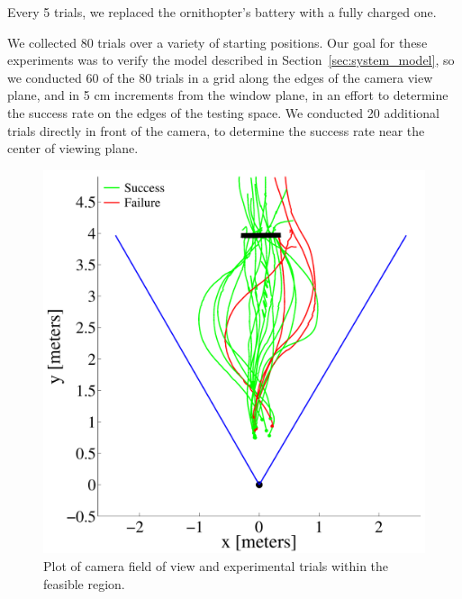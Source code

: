 \documentclass{aamas2013}
\begin{document}
Every 5 trials, we replaced the ornithopter's battery with a fully 
charged one.

We collected 80 trials over a variety of starting positions. Our 
goal for these experiments was to verify the model described in 
Section~\ref{sec:system_model}, so we conducted 60 of the 80 trials in a 
grid along the edges of the camera view plane, and in 5 cm increments 
from the window plane, in an effort to determine the success rate on the edges of 
the testing space. We conducted 20 additional trials directly in front of 
the camera, to determine the success rate near the center of viewing plane.

\begin{figure}[tb]
\begin{minipage}[b]{0.45\linewidth}
\centering
\includegraphics[width=\linewidth]{figures/flight_paths_feasible.pdf}
\caption{Plot of camera field of view and experimental trials within the feasible region.}
\label{fig:flight_paths_feasible}
\end{minipage}
\hfill
\begin{minipage}[b]{0.45\linewidth}
\centering

\end{minipage}
\end{figure}
\end{document}
